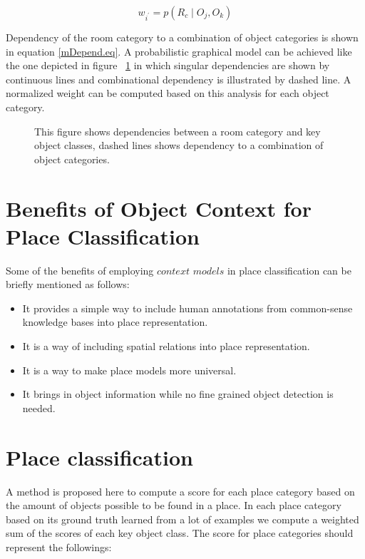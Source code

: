 \begin{equation}
 \label{mDepend.eq}
 w_{i^{'}} = p(R_c \mid O_j,O_k)
\end{equation}

Dependency of the room category to a combination of object categories is shown in equation \ref{mDepend.eq}. 
A probabilistic graphical model can be achieved like the one depicted in figure ~\ref{RoomObjectDepend.figure} in which
singular dependencies are shown by continuous lines and combinational dependency is illustrated by dashed line.
A normalized weight can be computed based on this analysis for each object category.  

 \begin{figure}[t]
  \caption[Probabilistic graphical model of place-object.]
  {This figure shows dependencies between a room category and key object classes, dashed lines shows dependency to a combination of object categories.}
  \label{RoomObjectDepend.figure}
\end{figure}

 
\section{Benefits of Object Context for Place Classification}
\label{BenefitsofObjectContextforPlaceClassification.sec}
Some of the benefits of employing $context$ $models$ in place classification can be briefly mentioned as follows: 
\begin{itemize}
 \item It provides a simple way to include human annotations from common-sense knowledge bases into place 
 representation.
 \item It is a way of including spatial relations into place representation.
 \item It is a way to make place models more universal.
 \item It brings in object information while no fine grained object detection is needed.
\end{itemize}


\section{Place classification}
\label{Place classification.sec}
A method is proposed here to compute a score for each place category based on the amount of objects possible to be
found in a place. 
In each place category based on its ground truth learned from a lot of examples we compute a weighted sum of the 
scores of each key object class.
The score for place categories should represent the followings:

